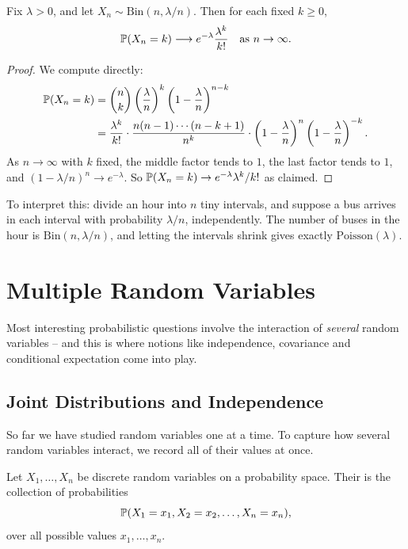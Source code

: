 \documentclass[a4paper]{scrartcl}
\begin{document}
\begin{theorem}
	Fix $\lambda > 0$, and let $X_n \sim \mathrm{Bin}(n, \lambda/n)$. Then for each fixed $k \geq 0$,
	$$
	\mathbb{P}(X_n = k) \longrightarrow e^{-\lambda} \frac{\lambda^k}{k!} \quad \text{as } n \rightarrow \infty.
	$$
\end{theorem}
\begin{proof}
	We compute directly:
	\begin{align*}
		\mathbb{P}(X_n = k) &= \binom{n}{k}\left(\frac{\lambda}{n}\right)^k \left(1 - \frac{\lambda}{n}\right)^{n - k} \\
		&= \frac{\lambda^k}{k!} \cdot \frac{n(n-1)\cdots(n - k + 1)}{n^k} \cdot \left(1 - \frac{\lambda}{n}\right)^{n} \left(1 - \frac{\lambda}{n}\right)^{-k}.
	\end{align*}
	As $n \rightarrow \infty$ with $k$ fixed, the middle factor tends to $1$, the last factor tends to $1$, and $(1 - \lambda/n)^n \rightarrow e^{-\lambda}$. So $\mathbb{P}(X_n = k) \rightarrow e^{-\lambda}\lambda^k/k!$ as claimed.
\end{proof}

To interpret this: divide an hour into $n$ tiny intervals, and suppose a bus arrives in each interval with probability $\lambda/n$, independently. The number of buses in the hour is $\mathrm{Bin}(n, \lambda/n)$, and letting the intervals shrink gives exactly $\mathrm{Poisson}(\lambda)$.


\section{Multiple Random Variables}

Most interesting probabilistic questions involve the interaction of \emph{several} random variables -- and this is where notions like independence, covariance and conditional expectation come into play.

\subsection{Joint Distributions and Independence}

So far we have studied random variables one at a time. To capture how several random variables interact, we record all of their values at once.

\begin{definition}
	Let $X_1, \dots, X_n$ be discrete random variables on a probability space. Their  is the collection of probabilities
	$$
	\mathbb{P}(X_1 = x_1, X_2 = x_2, \dots, X_n = x_n),
	$$
	over all possible values $x_1, \dots, x_n$.
\end{definition}
\end{document}

